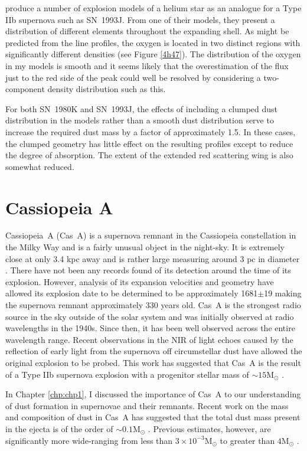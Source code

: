 \citet{Nomoto1993} produce a number of explosion models of a helium star as an analogue for a Type IIb supernova such as SN~1993J.  From one of their models, they present a distribution of different elements throughout the expanding shell.  As might be predicted from the line profiles, the oxygen is located in two distinct regions with significantly different densities (see Figure \ref{4h47}).   The distribution of the oxygen in my models is smooth and it seems likely that the overestimation of the flux just to the red side of the peak could well be resolved by considering a two-component density distribution such as this.

For both SN~1980K and SN~1993J, the effects of including a clumped dust distribution in the models rather than a smooth dust distribution serve to increase the required dust mass by a factor of approximately 1.5.  In these cases, the clumped geometry has little effect on the resulting profiles except to reduce the degree of absorption.  The extent of the extended red scattering wing is also somewhat reduced.


\section{Cassiopeia A}
\label{CasA_intro}

Cassiopeia~A (Cas~A) is a supernova remnant in the Cassiopeia constellation in the Milky Way and is a fairly unusual object in the night-sky.  It is extremely close at only 3.4 kpc away and  is rather large measuring around 3 pc in diameter \citep{Reed1995}.  There have not been any records found of its detection around the time of its explosion.  However, analysis of its expansion velocities and geometry have allowed its explosion date to be determined to be approximately 1681$\pm$19 \citep{Fesen2006} making the supernova remnant approximately 330 years old.  Cas~A is the strongest radio source in the sky outside of the solar system and was initially observed at radio wavelengths in the 1940s.  Since then, it has been well observed across the entire wavelength range.  Recent observations in the NIR of light echoes caused by the reflection of early light from the supernova off circumstellar dust have allowed the original explosion to be probed.  This work has suggested that Cas~A is the result of a Type IIb supernova explosion with a progenitor stellar mass of $\sim15$M$_{\odot}$ \citep{Krause2008}.

In Chapter \ref{chp:chp1}, I discussed the importance of Cas~A to our understanding of dust formation in supernovae and their remnants.  Recent work on the mass and composition of dust in Cas~A has suggested that the total dust mass present in the ejecta is of the order of $\sim0.1$M$_{\odot}$ \citep{Barlow2010,Nozawa2010,Arendt2014}.  Previous estimates, however, are significantly more wide-ranging from less than $3\times10^{-3}$M$_{\odot}$ to greater than $4$M$_{\odot}$ \citep{Milisavljevic2012}.  

